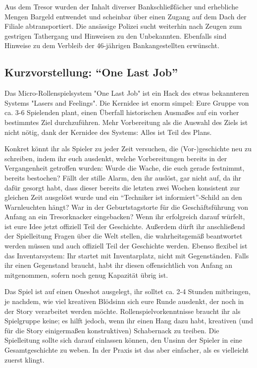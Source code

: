 \documentclass[final]{multiversum}
\begin{document}
Aus dem Tresor wurden der Inhalt diverser Bankschließfächer und erhebliche Mengen
Bargeld entwendet und scheinbar über einen Zugang auf dem Dach der Filiale
abtransportiert. Die ansässige Polizei sucht weiterhin nach Zeugen zum gestrigen
Tathergang und Hinweisen zu den Unbekannten. Ebenfalls sind Hinweise zu dem
Verbleib der 46-jährigen Bankangestellten erwünscht. 



\subsection{Kurzvorstellung: \enquote{One Last Job}}
Das Micro-Rollenspielsystem "One Last Job" ist ein Hack des etwas bekannteren
Systems "Lasers and Feelings". Die Kernidee ist enorm simpel: Eure Gruppe von
ca. 3-6 Spielenden plant, einen Überfall historischen Ausmaßes auf ein vorher
bestimmtes Ziel durchzuführen. Mehr Vorbereitung als die Auswahl des Ziels
ist nicht nötig, dank der Kernidee des Systems: Alles ist Teil des Plans.

Konkret könnt ihr als Spieler zu jeder Zeit versuchen, die (Vor-)geschichte neu
zu schreiben, indem ihr euch ausdenkt, welche Vorbereitungen bereits in der
Vergangenheit getroffen wurden: Wurde die Wache, die euch gerade festnimmt,
bereits bestochen? Fällt der stille Alarm, den ihr auslöst, gar nicht auf, da ihr
dafür gesorgt habt, dass dieser bereits die letzten zwei Wochen konsistent zur
gleichen Zeit ausgelöst wurde und ein \enquote{Techniker ist informiert}-Schild an den
Warnleuchten hängt? War in der Geburtstagstorte für die Geschäftsführung von
Anfang an ein Tresorknacker eingebacken? Wenn ihr erfolgreich darauf würfelt,
ist eure Idee jetzt offiziell Teil der Geschichte. Außerdem dürft ihr
anschließend der Spielleitung Fragen über die Welt stellen, die wahrheitsgemäß
beantwortet werden müssen und auch offiziell Teil der Geschichte werden. Ebenso
flexibel ist das Inventarsystem: Ihr startet mit Inventarplatz, nicht mit
Gegenständen. Falls ihr einen Gegenstand braucht, habt ihr diesen offensichtlich
von Anfang an mitgenommen, sofern noch genug Kapazität übrig ist.

Das Spiel ist auf einen Oneshot ausgelegt, ihr solltet ca. 2-4 Stunden
mitbringen, je nachdem, wie viel kreativen Blödsinn sich eure Runde ausdenkt, der
noch in der Story verarbeitet werden möchte. Rollenspielvorkenntnisse braucht
ihr als Spielgruppe keine; es hilft jedoch, wenn ihr einen Hang dazu habt,
kreativen (und für die Story einigermaßen konstruktiven) Schabernack zu treiben.
Die Spielleitung sollte sich darauf einlassen können, den Unsinn der Spieler in
eine Gesamtgeschichte zu weben. In der Praxis ist das aber einfacher, als es
vielleicht zuerst klingt.
\end{document}
